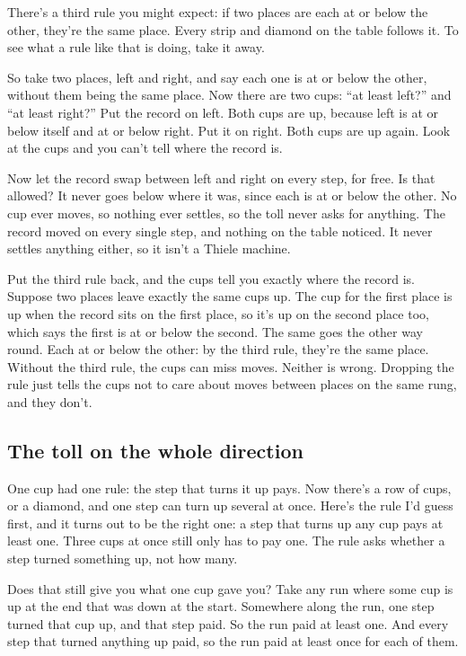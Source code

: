 \documentclass[11pt,twoside]{article}
\theoremstyle{thielethm}
\theoremstyle{thieledef}
\theoremstyle{thieledef}
\theoremstyle{thieledef}
\theoremstyle{thielethm}
\theoremstyle{thieleobs}
\theoremstyle{thielethm}
\begin{document}
There's a third rule you might expect: if two places are each at or below the other, they're the same place. Every strip and diamond on the table follows it. To see what a rule like that is doing, take it away.

So take two places, left and right, and say each one is at or below the other, without them being the same place. Now there are two cups: ``at least left?'' and ``at least right?'' Put the record on left. Both cups are up, because left is at or below itself and at or below right. Put it on right. Both cups are up again. Look at the cups and you can't tell where the record is.

Now let the record swap between left and right on every step, for free. Is that allowed? It never goes below where it was, since each is at or below the other. No cup ever moves, so nothing ever settles, so the toll never asks for anything. The record moved on every single step, and nothing on the table noticed. It never settles anything either, so it isn't a Thiele machine.

Put the third rule back, and the cups tell you exactly where the record is. Suppose two places leave exactly the same cups up. The cup for the first place is up when the record sits on the first place, so it's up on the second place too, which says the first is at or below the second. The same goes the other way round. Each at or below the other: by the third rule, they're the same place. Without the third rule, the cups can miss moves. Neither is wrong. Dropping the rule just tells the cups not to care about moves between places on the same rung, and they don't.

\subsection{The toll on the whole direction}

One cup had one rule: the step that turns it up pays. Now there's a row of cups, or a diamond, and one step can turn up several at once. Here's the rule I'd guess first, and it turns out to be the right one: a step that turns up any cup pays at least one. Three cups at once still only has to pay one. The rule asks whether a step turned something up, not how many.

Does that still give you what one cup gave you? Take any run where some cup is up at the end that was down at the start. Somewhere along the run, one step turned that cup up, and that step paid. So the run paid at least one. And every step that turned anything up paid, so the run paid at least once for each of them.
\end{document}
